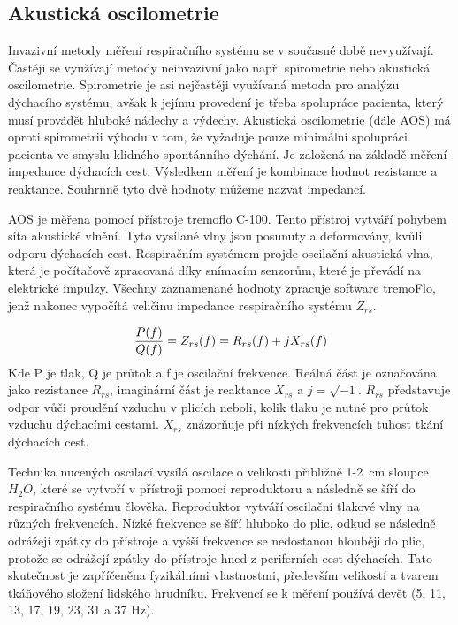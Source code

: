 \subsection {Akustická oscilometrie}
Invazivní metody měření respiračního systému se v současné době nevyužívají. Častěji se využívají metody neinvazivní jako např. spirometrie nebo akustická oscilometrie. Spirometrie je asi nejčastěji využívaná metoda pro analýzu dýchacího systému, avšak k jejímu provedení je třeba spolupráce pacienta, který musí provádět hluboké nádechy a výdechy.
Akustická oscilometrie (dále AOS) má oproti spirometrii výhodu v tom, že vyžaduje pouze minimální spolupráci pacienta ve smyslu klidného spontánního dýchání. 
Je založená na základě měření impedance dýchacích cest. Výsledkem měření je kombinace hodnot rezistance a reaktance. Souhrnně tyto dvě hodnoty můžeme nazvat impedancí. 

AOS je měřena pomocí přístroje tremoflo C-100. Tento přístroj vytváří pohybem síta akustické vlnění. Tyto vysílané vlny jsou posunuty a deformovány, kvůli odporu dýchacích cest. Respiračním systémem projde oscilační akustická vlna, která je počítačově zpracovaná díky snímacím senzorům, které je převádí na elektrické impulzy. Všechny zaznamenané hodnoty zpracuje software tremoFlo, jenž nakonec vypočítá veličinu impedance respiračního systému $Z_{rs}$. 

\begin{equation}
 \label{rce:1}
  {P(f) \over Q(f)} = Z_{rs}(f) = R_{rs}(f) + j X_{rs}(f) 
\end{equation}
Kde P je tlak, Q je průtok a f je oscilační frekvence. 
Reálná část je označována jako rezistance $R_{rs}$, imaginární část je reaktance $X_{rs}$ a $j = \sqrt{-1}$. 
$R_{rs}$ představuje odpor vůči proudění vzduchu v plicích neboli, kolik tlaku je nutné pro průtok vzduchu dýchacími cestami. $X_{rs}$ znázorňuje při nízkých frekvencích tuhost tkání dýchacích cest. 


Technika nucených oscilací vysílá oscilace o velikosti přibližně 1-2~cm sloupce $H_{2}O$, které se vytvoří v přístroji pomocí reproduktoru a následně se šíří do respiračního systému člověka. Reproduktor vytváří oscilační tlakové vlny na různých frekvencích. Nízké frekvence se šíří hluboko do plic, odkud se následně odrážejí zpátky do přístroje a vyšší frekvence se nedostanou hlouběji do plic, protože se  odrážejí zpátky do přístroje hned z periferních cest dýchacích. Tato skutečnost je zapříčeněna fyzikálními vlastnostmi, především velikostí a tvarem tkáňového složení lidského hrudníku. \cite{Vlcek2018} Frekvencí se k měření používá devět (5, 11, 13, 17, 19, 23, 31 a 37 Hz). 

